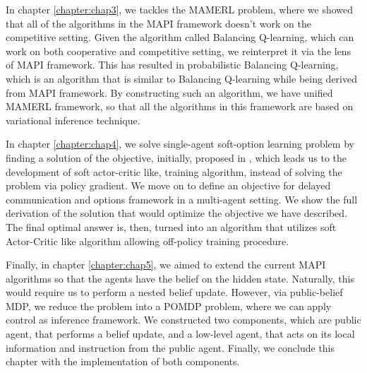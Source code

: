 In chapter \ref{chapter:chap3}, we tackles the MAMERL problem, where we showed that all of the algorithms in the MAPI framework doesn't work on the competitive setting. Given the algorithm called Balancing Q-learning, which can work on both cooperative and competitive setting, we reinterpret it via the lens of MAPI framework. This has resulted in probabilistic Balancing Q-learning, which is an algorithm that is similar to Balancing Q-learning while being derived from MAPI framework. By constructing such an algorithm, we have unified MAMERL framework, so that all the algorithms in this framework are based on variational inference technique. 

In chapter \ref{chapter:chap4}, we solve single-agent soft-option learning problem by finding a solution of the objective, initially, proposed in \cite{igl2019multitask}, which leads us to the development of soft actor-critic like, training algorithm, instead of solving the problem via policy gradient. We move on to define an objective for delayed communication and options framework in a multi-agent setting. We show the full derivation of the solution that would optimize the objective we have described. The final optimal answer is, then, turned into an algorithm that utilizes soft Actor-Critic like algorithm allowing off-policy training procedure. 

Finally, in chapter \ref{chapter:chap5}, we aimed to extend the current MAPI algorithms so that the agents have the belief on the hidden state. Naturally, this would require us to perform a nested belief update. However, via public-belief MDP, we reduce the problem into a POMDP problem, where we can apply control as inference framework. We constructed two components, which are public agent, that performs a belief update, and a low-level agent, that acts on its local information and instruction from the public agent. Finally, we conclude this chapter with the implementation of both components. 